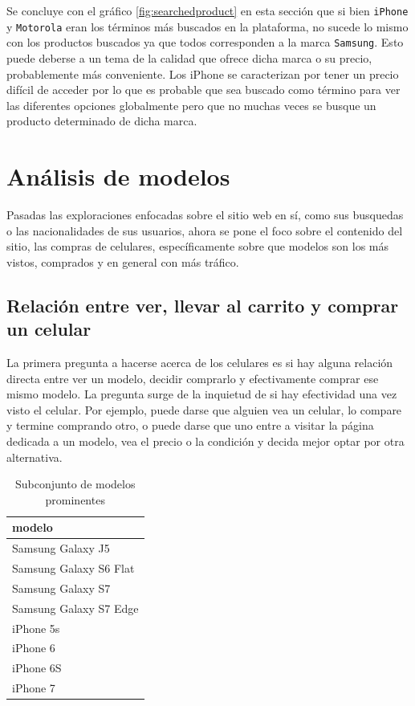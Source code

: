 \documentclass[a4paper]{article}
\begin{document}
Se concluye con el gráfico \ref{fig:searchedproduct} en esta sección que si bien \texttt{iPhone} y \texttt{Motorola} eran los términos más buscados en la plataforma, no sucede lo mismo con los productos buscados ya que todos corresponden a la marca \texttt{Samsung}. Esto puede deberse a un tema de la calidad que ofrece dicha marca o su precio, probablemente más conveniente. Los iPhone se caracterizan por tener un precio difícil de acceder por lo que es probable que sea buscado como término para ver las diferentes opciones globalmente pero que no muchas veces se busque un producto determinado de dicha marca.

\section{Análisis de modelos} \label{modelo}

Pasadas las exploraciones enfocadas sobre el sitio web en sí, como sus busquedas o las nacionalidades de sus usuarios, ahora se pone el foco sobre el contenido del sitio, las compras de celulares, específicamente sobre que modelos son los más vistos, comprados y en general con más tráfico.

\subsection{Relación entre ver, llevar al carrito y comprar un celular}

La primera pregunta a hacerse acerca de los celulares es si hay alguna relación directa entre ver un modelo, decidir comprarlo y efectivamente comprar ese mismo modelo.  La pregunta surge de la inquietud de si hay efectividad una vez visto el celular. Por ejemplo, puede darse que alguien vea un celular, lo compare y termine comprando otro, o puede darse que uno entre a visitar la página dedicada a un modelo, vea el precio o la condición y decida mejor optar por otra alternativa.

\begin{table}[h!]
	\begin{center}
		\begin{tabular}{|l|}
			\hline
			modelo \\
			\hline \hline
			Samsung Galaxy J5 \\
			Samsung Galaxy S6 Flat \\
			Samsung Galaxy S7 \\
			Samsung Galaxy S7 Edge \\
			iPhone 5s \\
			iPhone 6 \\
			iPhone 6S \\
			iPhone 7
		\end{tabular}
		\caption{Subconjunto de modelos prominentes}
		\label{table:modelos_prominentes}
	\end{center}
\end{table}
\end{document}

